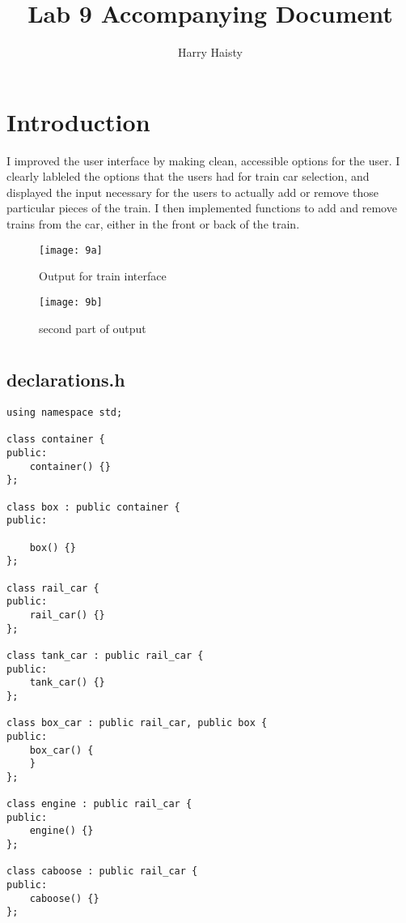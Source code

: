 \documentclass[11pt]{article}
\title{Lab 9 Accompanying Document}
\date{}
\author{Harry Haisty}
\begin{document}
\maketitle

\section*{Introduction}
I improved the user interface by making clean, accessible options for the user. I clearly lableled the options that the users had for train car selection, and displayed the input necessary for the users to actually add or remove those particular pieces of the train. I then implemented functions to add and remove trains from the car, either in the front or back of the train. 

\begin{figure}[h]
    \centering
    \texttt{[image: 9a]}
    \caption{Output for train interface }
\end{figure}

\begin{figure}[h]
    \centering
    \texttt{[image: 9b]}
    \caption{second part of output}
\end{figure}

\newpage \newpage
\section*{} 
\newpage
\subsection*{declarations.h}
\begin{lstlisting}
using namespace std;

class container {
public:
    container() {}
};

class box : public container {
public:

    box() {}
};

class rail_car {
public:
    rail_car() {}
};

class tank_car : public rail_car {
public:
    tank_car() {}
};

class box_car : public rail_car, public box {
public:
    box_car() {
    }
};

class engine : public rail_car {
public:
    engine() {}
};

class caboose : public rail_car {
public:
    caboose() {}
};


\end{lstlisting}
\end{document}
